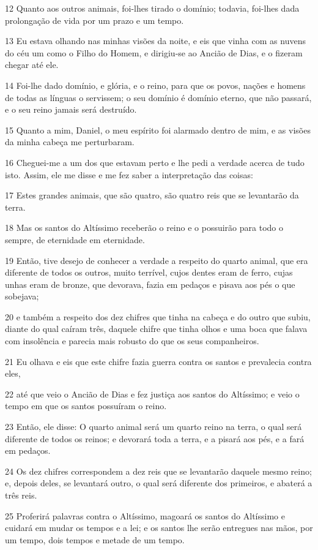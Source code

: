 \par 12 Quanto aos outros animais, foi-lhes tirado o domínio; todavia, foi-lhes dada prolongação de vida por um prazo e um tempo.
\par 13 Eu estava olhando nas minhas visões da noite, e eis que vinha com as nuvens do céu um como o Filho do Homem, e dirigiu-se ao Ancião de Dias, e o fizeram chegar até ele.
\par 14 Foi-lhe dado domínio, e glória, e o reino, para que os povos, nações e homens de todas as línguas o servissem; o seu domínio é domínio eterno, que não passará, e o seu reino jamais será destruído.
\par 15 Quanto a mim, Daniel, o meu espírito foi alarmado dentro de mim, e as visões da minha cabeça me perturbaram.
\par 16 Cheguei-me a um dos que estavam perto e lhe pedi a verdade acerca de tudo isto. Assim, ele me disse e me fez saber a interpretação das coisas:
\par 17 Estes grandes animais, que são quatro, são quatro reis que se levantarão da terra.
\par 18 Mas os santos do Altíssimo receberão o reino e o possuirão para todo o sempre, de eternidade em eternidade.
\par 19 Então, tive desejo de conhecer a verdade a respeito do quarto animal, que era diferente de todos os outros, muito terrível, cujos dentes eram de ferro, cujas unhas eram de bronze, que devorava, fazia em pedaços e pisava aos pés o que sobejava;
\par 20 e também a respeito dos dez chifres que tinha na cabeça e do outro que subiu, diante do qual caíram três, daquele chifre que tinha olhos e uma boca que falava com insolência e parecia mais robusto do que os seus companheiros.
\par 21 Eu olhava e eis que este chifre fazia guerra contra os santos e prevalecia contra eles,
\par 22 até que veio o Ancião de Dias e fez justiça aos santos do Altíssimo; e veio o tempo em que os santos possuíram o reino.
\par 23 Então, ele disse: O quarto animal será um quarto reino na terra, o qual será diferente de todos os reinos; e devorará toda a terra, e a pisará aos pés, e a fará em pedaços.
\par 24 Os dez chifres correspondem a dez reis que se levantarão daquele mesmo reino; e, depois deles, se levantará outro, o qual será diferente dos primeiros, e abaterá a três reis.
\par 25 Proferirá palavras contra o Altíssimo, magoará os santos do Altíssimo e cuidará em mudar os tempos e a lei; e os santos lhe serão entregues nas mãos, por um tempo, dois tempos e metade de um tempo.
